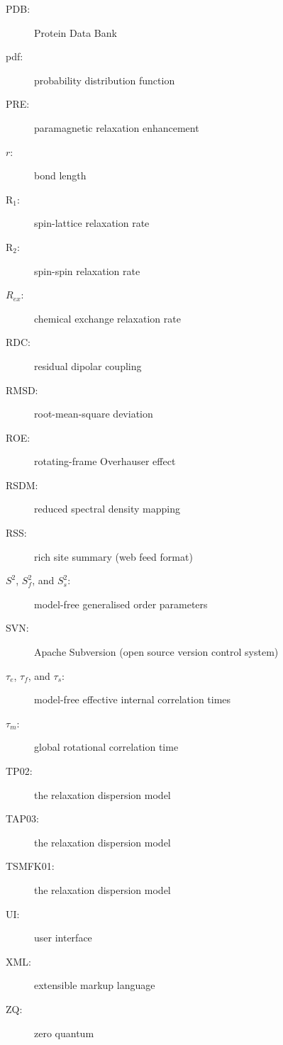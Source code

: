 \documentclass[a4paper, 11pt, twoside, openright]{book}
\newenvironment{spacedpara}{\setlength{\parindent}{0pt} \setlength{\parskip}{2ex plus 0.5ex minus 0.2ex}}{}
\newcommand{\Rone}{\mathrm{R}_1}
\newcommand{\Rtwo}{\mathrm{R}_2}
\begin{document}
\begin{description}
  \item[PDB:]  Protein Data Bank
  \item[pdf:]  probability distribution function
  \item[PRE:]  paramagnetic relaxation enhancement
  \item[$r$:]  bond length
  \item[$\Rone$:]  spin-lattice relaxation rate
  \item[$\Rtwo$:]  spin-spin relaxation rate
  \item[$R_{ex}$:]  chemical exchange relaxation rate
  \item[RDC:]  residual dipolar coupling
  \item[RMSD:]  root-mean-square deviation
  \item[ROE:]  rotating-frame Overhauser effect
  \item[RSDM:]  reduced spectral density mapping
  \item[RSS:]  rich site summary (web feed format)
  \item[$S^2$, $S^2_f$, and $S^2_s$:]  model-free generalised order parameters
  \item[SVN:]  Apache Subversion (open source version control system)
  \item[$\tau_e$, $\tau_f$, and $\tau_s$:]  model-free effective internal correlation times
  \item[$\tau_m$:]  global rotational correlation time
  \item[TP02:]  the \citet{TrottPalmer02} relaxation dispersion model
  \item[TAP03:]  the \citet{Trott03} relaxation dispersion model
  \item[TSMFK01:]  the \citet{Tollinger01} relaxation dispersion model
  \item[UI:]  user interface
  \item[XML:]  extensible markup language
  \item[ZQ:]  zero quantum
\end{description}

\begin{htmlonly}
\addtocounter{chapter}{-1}
\end{htmlonly}



\begin{spacedpara}

\end{spacedpara}
\end{document}
